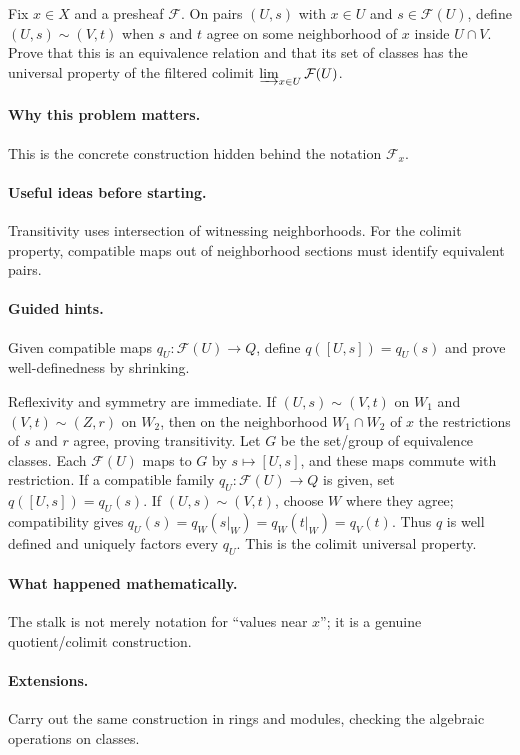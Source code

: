 \begin{problem}
Fix $x\in X$ and a presheaf $\mathcal F$. On pairs $(U,s)$ with $x\in U$ and $s\in\mathcal F(U)$, define $(U,s)\sim(V,t)$ when $s$ and $t$ agree on some neighborhood of $x$ inside $U\cap V$. Prove that this is an equivalence relation and that its set of classes has the universal property of the filtered colimit $\varinjlim_{x\in U}\mathcal F(U)$.
\end{problem}

\paragraph{Why this problem matters.}
This is the concrete construction hidden behind the notation $\mathcal F_x$.

\paragraph{Useful ideas before starting.}
Transitivity uses intersection of witnessing neighborhoods. For the colimit property, compatible maps out of neighborhood sections must identify equivalent pairs.

\paragraph{Guided hints.}
Given compatible maps $q_U:\mathcal F(U)\to Q$, define $q([U,s])=q_U(s)$ and prove well-definedness by shrinking.

\ifdefined\FullProblemDossiers
\begin{solution}
Reflexivity and symmetry are immediate. If $(U,s)\sim(V,t)$ on $W_1$ and $(V,t)\sim(Z,r)$ on $W_2$, then on the neighborhood $W_1\cap W_2$ of $x$ the restrictions of $s$ and $r$ agree, proving transitivity. Let $G$ be the set/group of equivalence classes. Each $\mathcal F(U)$ maps to $G$ by $s\mapsto[U,s]$, and these maps commute with restriction. If a compatible family $q_U:\mathcal F(U)\to Q$ is given, set $q([U,s])=q_U(s)$. If $(U,s)\sim(V,t)$, choose $W$ where they agree; compatibility gives $q_U(s)=q_W(s|_W)=q_W(t|_W)=q_V(t)$. Thus $q$ is well defined and uniquely factors every $q_U$. This is the colimit universal property.
\end{solution}

\paragraph{What happened mathematically.}
The stalk is not merely notation for ``values near $x$''; it is a genuine quotient/colimit construction.

\paragraph{Extensions.}
Carry out the same construction in rings and modules, checking the algebraic operations on classes.
\fi
